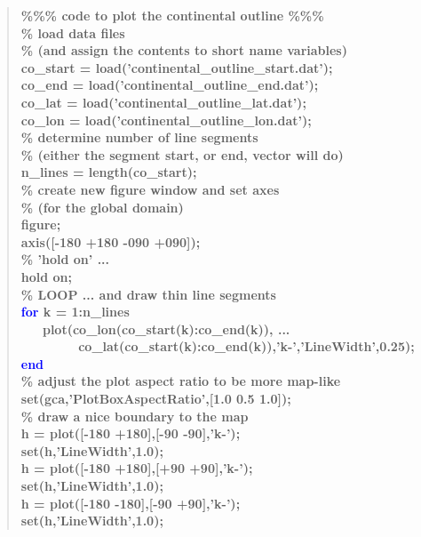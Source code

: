 \documentclass{tufte-book} %
\newenvironment{docspecbold}{\begin{quotation}\ttfamily\bfseries\parskip0pt\parindent0pt\ignorespaces}{\end{quotation}}
\begin{document}
\begin{docspecbold}
\textcolor[rgb]{0,0.501961,0}{\%\%\% code to plot the continental outline \%\%\%}
\\\textcolor[rgb]{0,0.501961,0}{\% load data files
\\\% (and assign the contents to short name variables) }
\\co\_start = load('continental\_outline\_start.dat');
\\co\_end = load('continental\_outline\_end.dat');
\\co\_lat = load('continental\_outline\_lat.dat');
\\co\_lon = load('continental\_outline\_lon.dat');
\\\textcolor[rgb]{0,0.501961,0}{\% determine number of line segments 
\\\% (either the segment start, or end, vector will do)}
\\n\_lines = length(co\_start);
\\\textcolor[rgb]{0,0.501961,0}{\% create new figure window and set axes \\\% (for the global domain)}
\\figure;
\\axis([-180 +180 -090 +090]);
\\\textcolor[rgb]{0,0.501961,0}{\% 'hold on' ...}
\\hold on;
\\\textcolor[rgb]{0,0.501961,0}{\% LOOP ... and draw thin line segments}
\\\textcolor{blue}{for} k = 1:n\_lines
\\ \ \ \ plot(co\_lon(co\_start(k):co\_end(k)), ...
\\ \ \ \ \ \ \ \ \ co\_lat(co\_start(k):co\_end(k)),'k-','LineWidth',0.25);
\\\textcolor{blue}{end}
\\\textcolor[rgb]{0,0.501961,0}{\% adjust the plot aspect ratio to be more map-like}
\\set(gca,'PlotBoxAspectRatio',[1.0 0.5 1.0]);
\\\textcolor[rgb]{0,0.501961,0}{\% draw a nice boundary to the map}
\\h = plot([-180 +180],[-90 -90],'k-');
\\set(h,'LineWidth',1.0);
\\h = plot([-180 +180],[+90 +90],'k-');
\\set(h,'LineWidth',1.0);
\\h = plot([-180 -180],[-90 +90],'k-');
\\set(h,'LineWidth',1.0);

\end{docspecbold}
\end{document}
